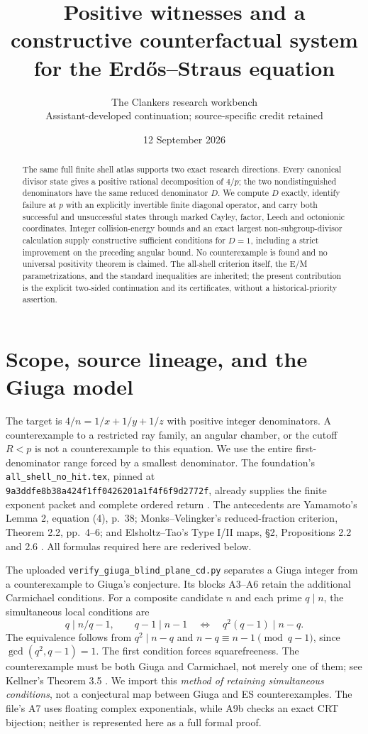 \documentclass[11pt]{article}
\title{Positive witnesses and a constructive counterfactual system\\for the Erd\H{o}s--Straus equation}
\author{The Clankers research workbench\\\small Assistant-developed continuation; source-specific credit retained}
\date{12 September 2026}
\theoremstyle{definition}\newtheorem{definition}[theorem]{Definition}
\theoremstyle{remark}\newtheorem{remark}[theorem]{Remark}
\begin{document}
\maketitle
\begin{abstract}
The same full finite shell atlas supports two exact research directions. Every
canonical divisor state gives a positive rational decomposition of $4/p$;
the two nondistinguished denominators have the same reduced denominator $D$.
We compute $D$ exactly, identify failure at $p$ with an explicitly invertible
finite diagonal operator, and carry both successful and unsuccessful states
through marked Cayley, factor, Leech and octonionic coordinates. Integer
collision-energy bounds and an exact largest non-subgroup-divisor calculation
supply constructive sufficient conditions for $D=1$, including a strict
improvement on the preceding angular bound. No counterexample is found and
no universal positivity theorem is claimed. The all-shell criterion itself,
the E/M parametrizations, and the standard inequalities are inherited;
the present contribution is the explicit two-sided continuation and its
certificates, without a historical-priority assertion.
\end{abstract}

\section{Scope, source lineage, and the Giuga model}
The target is $4/n=1/x+1/y+1/z$ with positive integer denominators.
A counterexample to a restricted ray family, an angular chamber, or the
cutoff $R<p$ is not a counterexample to this equation. We use the entire
first-denominator range forced by a smallest denominator. The foundation's
\texttt{all\_shell\_no\_hit.tex}, pinned at
\texttt{9a3ddfe8b38a424f1ff0426201a1f4f6f9d2772f}, already supplies the
finite exponent packet and complete ordered return \cite{foundation}.
The antecedents are Yamamoto's Lemma 2, equation (4), p.~38;
Monks--Velingker's reduced-fraction criterion, Theorem 2.2, pp.~4--6;
and Elsholtz--Tao's Type I/II maps, \S2, Propositions 2.2 and 2.6
\cite{yamamoto,mv,et}. All formulas required here are rederived below.

The uploaded \texttt{verify\_giuga\_blind\_plane\_cd.py} separates a Giuga
integer from a counterexample to Giuga's conjecture. Its blocks A3--A6
retain the additional Carmichael conditions. For a composite candidate $n$
and each prime $q\mid n$, the simultaneous local conditions are
\[
 q\mid n/q-1,\qquad q-1\mid n-1
 \quad\Longleftrightarrow\quad q^2(q-1)\mid n-q.
\]
The equivalence follows from $q^2\mid n-q$ and
$n-q\equiv n-1\pmod{q-1}$, since $\gcd(q^2,q-1)=1$.
The first condition forces squarefreeness. The counterexample must be both
Giuga and Carmichael, not merely one of them; see Kellner's Theorem 3.5
\cite{kellner}. We import this \emph{method of retaining simultaneous
conditions}, not a conjectural map between Giuga and ES counterexamples.
The file's A7 uses floating complex exponentials, while A9b checks an exact
CRT bijection; neither is represented here as a full formal proof.
\end{document}
